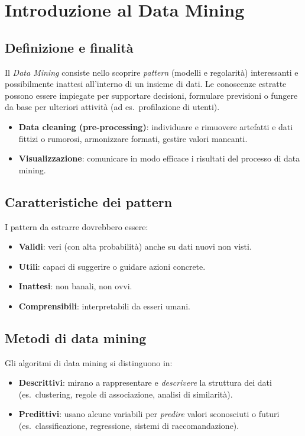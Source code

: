 \chapter{Introduzione al Data Mining}\label{ch:introduzione}

\section{Definizione e finalità}\label{sec:definizione}
Il \emph{Data Mining} consiste nello scoprire \emph{pattern} (modelli e regolarità) interessanti e possibilmente inattesi all'interno di un insieme di dati. Le conoscenze estratte possono essere impiegate per supportare decisioni, formulare previsioni o fungere da base per ulteriori attività (ad es.\ profilazione di utenti).
%
\begin{itemize}
  \item \textbf{Data cleaning (pre-processing)}: individuare e rimuovere artefatti e dati fittizi o rumorosi, armonizzare formati, gestire valori mancanti.
  \item \textbf{Visualizzazione}: comunicare in modo efficace i risultati del processo di data mining.
\end{itemize}

\section{Caratteristiche dei pattern}\label{sec:caratteristiche-pattern}
I pattern da estrarre dovrebbero essere:
\begin{itemize}
  \item \textbf{Validi}: veri (con alta probabilità) anche su dati nuovi non visti.
  \item \textbf{Utili}: capaci di suggerire o guidare azioni concrete.
  \item \textbf{Inattesi}: non banali, non ovvi.
  \item \textbf{Comprensibili}: interpretabili da esseri umani.
\end{itemize}

\section{Metodi di data mining}\label{sec:metodi}
Gli algoritmi di data mining si distinguono in:
\begin{itemize}
  \item \textbf{Descrittivi}: mirano a rappresentare e \emph{descrivere} la struttura dei dati (es.\ clustering, regole di associazione, analisi di similarità).
  \item \textbf{Predittivi}: usano alcune variabili per \emph{predire} valori sconosciuti o futuri (es.\ classificazione, regressione, sistemi di raccomandazione).
\end{itemize}

